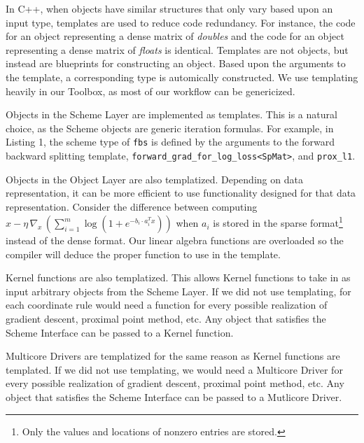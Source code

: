 In C++, when objects have similar structures that only vary based upon an input type, templates are used to reduce code redundancy. For instance, the code for an object representing a dense matrix of \emph{doubles} and the code for an object representing a dense matrix of \emph{floats} is identical.
Templates are not objects, but instead are blueprints for constructing an object.
Based upon the arguments to the template, a corresponding type is automically constructed.
We use templating heavily in our Toolbox, as most of our workflow can be genericized.

Objects in the Scheme Layer are implemented as templates.
This is a natural choice, as the Scheme objects are generic iteration formulas.
For example, in Listing 1, the scheme type of \texttt{fbs} is defined by the arguments to the forward backward splitting template, \texttt{forward\_grad\_for\_log\_loss<SpMat>}, and \texttt{prox\_l1}.

Objects in the Object Layer are also templatized. Depending on data representation, it can be more efficient to use functionality designed for that data representation. Consider the difference between computing $x - \eta \, \nabla_x \,(\sum_{i = 1}^m \log (1 + e^{-b_i \cdot a_i^T x}))$ when $a_i$ is stored in the  sparse format\footnote{Only the values and locations of  nonzero entries are stored.} instead of the dense format.
Our linear algebra functions are overloaded so the compiler will deduce the proper function to use in the template.

Kernel functions are also templatized. This allows Kernel functions to take in as input arbitrary objects from the Scheme Layer. If we did not use templating, for each coordinate rule would need a function for every possible realization of gradient descent, proximal point method, etc.  Any object that satisfies the Scheme Interface can be passed to a Kernel function.

Multicore Drivers are templatized for the same reason as Kernel functions are templated. If we did not use templating, we would need a Multicore Driver for every possible realization of gradient descent, proximal point method, etc. Any object that satisfies the Scheme Interface can be passed to a Mutlicore Driver.
